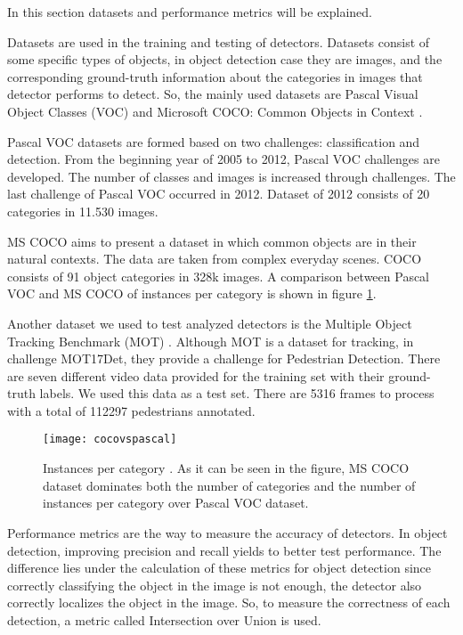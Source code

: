 \documentclass{article}
\begin{document}
\setlength{\parindent}{6ex}

\indent

In this section datasets and performance metrics will be explained. \par 
Datasets are used in the training and testing of detectors. Datasets consist of some 
specific types of objects, in object detection case they are images, and the 
corresponding ground-truth information about the categories in images that 
detector performs to detect. So, the mainly used datasets are Pascal Visual Object 
Classes (VOC) \cite{pascalvoc} and Microsoft COCO: Common Objects in Context 
\cite{mscoco}. \par

Pascal VOC datasets are formed based on two challenges: classification and detection. From the 
beginning year of 2005 to 2012, Pascal VOC challenges are developed. The number of classes and images 
is increased through challenges. The last challenge of Pascal VOC occurred in 2012. Dataset of 
2012 consists of 20 categories in 11.530 images. \par

MS COCO aims to present a dataset in which common objects are in their natural 
contexts. The data are taken from complex everyday scenes. COCO consists of 91 
object categories in 328k images. A comparison between Pascal VOC and MS COCO 
of instances per category is shown in figure \ref{fig:cocovspascal1}. \par

Another dataset we used to test analyzed detectors is the Multiple Object Tracking Benchmark 
(MOT) \cite{mot}. Although MOT is a dataset for tracking, in challenge MOT17Det, they provide a 
challenge for Pedestrian Detection. There are seven different video data provided for 
the training set with their ground-truth labels. We used this data as a test set. There are 
5316 frames to process with a total of 112297 pedestrians annotated. 

\begin{figure}
    \centering
    \texttt{[image: cocovspascal]}
    \caption{Instances per category \cite{mscoco}. As it can be seen in the figure, 
    MS COCO dataset dominates both the number of categories and the number of instances per 
    category over Pascal VOC dataset.}
    \label{fig:cocovspascal1}
\end{figure}
\indent

Performance metrics are the way to measure the accuracy of detectors. In object 
detection, improving precision and recall yields to better test performance. The 
difference lies under the calculation of these metrics for object detection since 
correctly classifying the object in the image is not enough, the detector also correctly 
localizes the object in the image. So, to measure the correctness of each detection, 
a metric called Intersection over Union is used.
\end{document}
